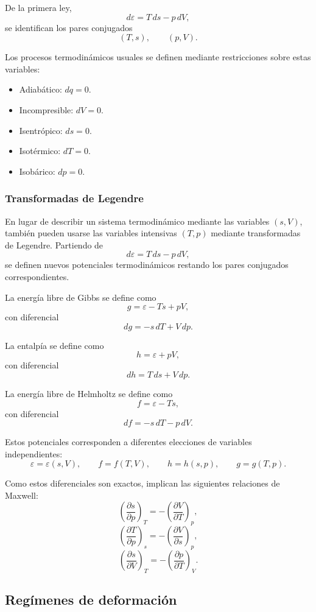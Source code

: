 De la primera ley,
$$ d\varepsilon = T\,ds - p\,dV, $$
se identifican los pares conjugados
$$ (T,s), \qquad (p,V). $$

Los procesos termodinámicos usuales se definen mediante restricciones sobre estas variables:

\begin{itemize}
\item Adiabático: $dq=0$.
\item Incompresible: $dV=0$.
\item Isentrópico: $ds=0$.
\item Isotérmico: $dT=0$.
\item Isobárico: $dp=0$.
\end{itemize}

\subsubsection*{Transformadas de Legendre}

En lugar de describir un sistema termodinámico mediante las variables $(s,V)$, también pueden usarse las variables intensivas $(T,p)$ mediante transformadas de Legendre. Partiendo de
$$ d\varepsilon = T\,ds - p\,dV, $$
se definen nuevos potenciales termodinámicos restando los pares conjugados correspondientes.

La energía libre de Gibbs se define como
$$ g = \varepsilon - Ts + pV, $$
con diferencial
$$ dg = -s\,dT + V\,dp. $$

La entalpía se define como
$$ h = \varepsilon + pV, $$
con diferencial
$$ dh = T\,ds + V\,dp. $$

La energía libre de Helmholtz se define como
$$ f = \varepsilon - Ts, $$
con diferencial
$$ df = -s\,dT - p\,dV. $$

Estos potenciales corresponden a diferentes elecciones de variables independientes:
$$ \varepsilon = \varepsilon(s,V), \qquad f = f(T,V), \qquad h = h(s,p), \qquad g = g(T,p). $$

Como estos diferenciales son exactos, implican las siguientes relaciones de Maxwell:
$$ \left(\frac{\partial s}{\partial p}\right)_T = -\left(\frac{\partial V}{\partial T}\right)_p, $$
$$ \left(\frac{\partial T}{\partial p}\right)_s = -\left(\frac{\partial V}{\partial s}\right)_p, $$
$$ \left(\frac{\partial s}{\partial V}\right)_T = -\left(\frac{\partial p}{\partial T}\right)_V. $$

\subsection{Regímenes de deformación}

